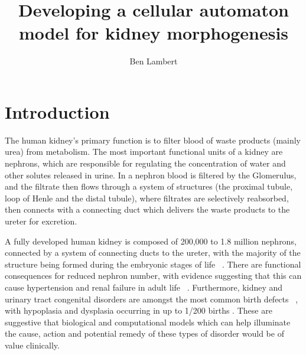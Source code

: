 \documentclass[pdftex,10pt,a4paper,twocolumn]{article}
\title{\textbf{Developing a cellular automaton model for kidney morphogenesis}}
\author{Ben Lambert}
\begin{document}

\section{Introduction}
The human kidney's primary function is to filter blood of waste products (mainly urea) from metabolism. The most important functional units of a kidney are nephrons, which are responsible for regulating the concentration of water and other solutes released in urine. In a nephron blood is filtered by the Glomerulus, and the filtrate then flows through a system of structures (the proximal tubule, loop of Henle and the distal tubule), where filtrates are selectively reabsorbed, then connects with a connecting duct which delivers the waste products to the ureter for excretion.

A fully developed human kidney is composed of 200,000 to 1.8 million nephrons, connected by a system of connecting ducts to the ureter, with the majority of the structure being formed during the embryonic stages of life ~\cite{hughson2003glomerular}. There are functional consequences for reduced nephron number, with evidence suggesting that this can cause hypertension and renal failure in adult life ~\cite{hoy2008nephron}. Furthermore, kidney and urinary tract congenital disorders are amongst the most common birth defects ~\cite{airik2007down}, with hypoplasia and dysplasia occurring in up to 1/200 births \cite{weber2006prevalence}. These are suggestive that biological and computational models which can help illuminate the cause, action and potential remedy of these types of disorder would be of value clinically.
\end{document}
